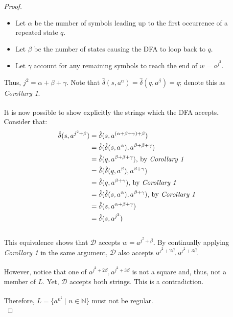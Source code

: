\documentclass[12pt]{article}
\begin{document}
\begin{proof}
    \begin{itemize}
        \item Let \( \alpha \) be the number of symbols leading up to the first occurrence of a repeated state \( q \).
        \item Let \( \beta \) be the number of states causing the DFA to loop back to \( q \).
        \item Let \( \gamma \) account for any remaining symbols to reach the end of \( w = a^{j^2} \).
    \end{itemize}
    Thus, \( j^2 = \alpha + \beta + \gamma \). Note that \( \hat{\delta}(s, a^{\alpha}) = \hat{\delta}(q, a^{\beta}) = q \); denote this as \textit{Corollary 1}. \\
    \\
    It is now possible to show explicitly the strings which the DFA accepts. \\
    Consider that:
    \begin{equation*}
        \begin{aligned}
            \hat{\delta}(s, a^{j^2 + \beta}) &= \hat{\delta}(s, a^{(\alpha + \beta + \gamma) + \beta}) \\
            &= \hat{\delta}(\hat{\delta}(s, a^{\alpha}), a^{\beta + \beta + \gamma}) \\
            &= \hat{\delta}(q, a^{\beta + \beta + \gamma}) \text{, by \textit{Corollary 1}} \\
            &= \hat{\delta}(\hat{\delta}(q, a^{\beta}), a^{\beta + \gamma}) \\
            &= \hat{\delta}(q, a^{\beta + \gamma}) \text{, by \textit{Corollary 1}} \\
            &= \hat{\delta}(\hat{\delta}(s, a^{\alpha}), a^{\beta + \gamma}) \text{, by \textit{Corollary 1}} \\
            &= \hat{\delta}(s, a^{\alpha + \beta + \gamma}) \\
            &= \hat{\delta}(s, a^{j^2})
        \end{aligned}
    \end{equation*}
    \\
    This equivalence shows that \( \mathcal{D} \) accepts \( w = a^{j^2 + \beta} \). By continually applying \textit{Corollary 1} in the same argument, \( \mathcal{D} \) also accepts \( a^{j^2 + 2\beta}, a^{j^2 + 3\beta} \). \\
    \\
    However, notice that one of \( a^{j^2 + 2\beta}, a^{j^2 + 3\beta} \) is not a square and, thus, not a member of \( L \). Yet, \( \mathcal{D}  \) accepts both strings. This is a contradiction. \\
    \\
    Therefore, \( L = \{ a^{n^2} \mid n \in \mathbb{N} \} \) must not be regular. \\
\end{proof}
\end{document}
